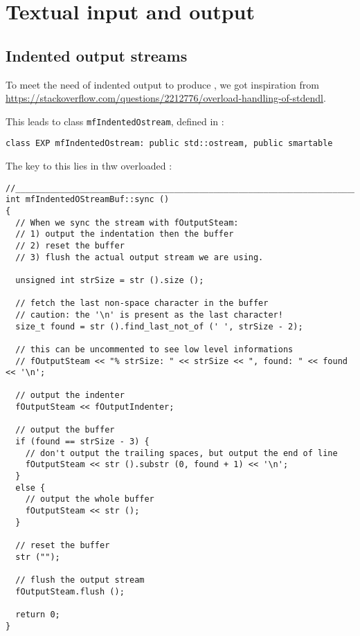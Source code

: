 
\chapter{Textual input and output}



\section{Indented output streams}

To meet the need of indented output to produce , we got inspiration from \url{https://stackoverflow.com/questions/2212776/overload-handling-of-stdendl}.

This leads to class   {\tt mfIndentedOstream}, defined in :
\begin{lstlisting}[language=CPlusPlus]
class EXP mfIndentedOstream: public std::ostream, public smartable
\end{lstlisting}

The key to this lies in thw overloaded :
\begin{lstlisting}[language=CPlusPlus]
//______________________________________________________________________________
int mfIndentedOStreamBuf::sync ()
{
  // When we sync the stream with fOutputSteam:
  // 1) output the indentation then the buffer
  // 2) reset the buffer
  // 3) flush the actual output stream we are using.

  unsigned int strSize = str ().size ();

  // fetch the last non-space character in the buffer
  // caution: the '\n' is present as the last character!
  size_t found = str ().find_last_not_of (' ', strSize - 2);

  // this can be uncommented to see low level informations
  // fOutputSteam << "% strSize: " << strSize << ", found: " << found << '\n';

  // output the indenter
  fOutputSteam << fOutputIndenter;

  // output the buffer
  if (found == strSize - 3) {
    // don't output the trailing spaces, but output the end of line
    fOutputSteam << str ().substr (0, found + 1) << '\n';
  }
  else {
    // output the whole buffer
    fOutputSteam << str ();
  }

  // reset the buffer
  str ("");

  // flush the output stream
  fOutputSteam.flush ();

  return 0;
}
\end{lstlisting}

